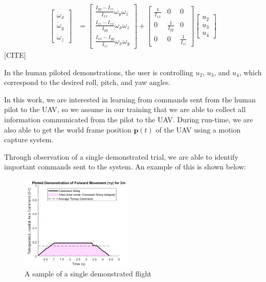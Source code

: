 \documentclass[letterpaper, 10 pt, conference]{ieeeconf}  %
\begin{document}
\begin{equation}
\begin{aligned}
	\begin{bmatrix}\dot{\omega}_{x} \\ \dot{\omega}_{y} \\ \dot{\omega}_{z}\end{bmatrix} &= \begin{bmatrix}\frac{I_{yy} - I_{zz}}{I_{xx}} \omega_{y}\omega_{z}\\ \frac{I_{zz} - I_{xx}}{I_{yy}} \omega_{x}\omega_{z} \\ \frac{I_{xx} - I_{yy}}{I_{zz}} \omega_{x}\omega_{y} \end{bmatrix} +  \begin{bmatrix}\frac{1}{I_{xx}} & 0 & 0\\ 0 & \frac{1}{I_{yy}} & 0\\ 0 & 0 & \frac{1}{I_{zz}}\end{bmatrix} \begin{bmatrix}u_{2} \\ u_{3} \\ u_{4} \end{bmatrix}
	\end{aligned}
	\label{eq:quadrotor_dynamics} \nonumber
\end{equation} [CITE]

In the human piloted demonstrations, the user is controlling $u_2$, $u_3$, and $u_4$, which correspond to the desired roll, pitch, and yaw angles. 

In this work, we are interested in learning from commands sent from the human pilot to the UAV, so we assume in our training that we are able to collect all information communicated from the pilot to the UAV. During run-time, we are also able to get the world frame position $\mathbf{p}(t)$ of the UAV using a motion capture system.

Through observation of a single demonstrated trial, we are able to identify important commands sent to the system. An example of this is shown below:

\begin{figure}[ht]
    \includegraphics[width=0.48\textwidth]{images/sampleintegral.png}
    \caption{A sample of a single demonstrated flight}
    \label{fig:sampleintegral}
\end{figure}
\end{document}

